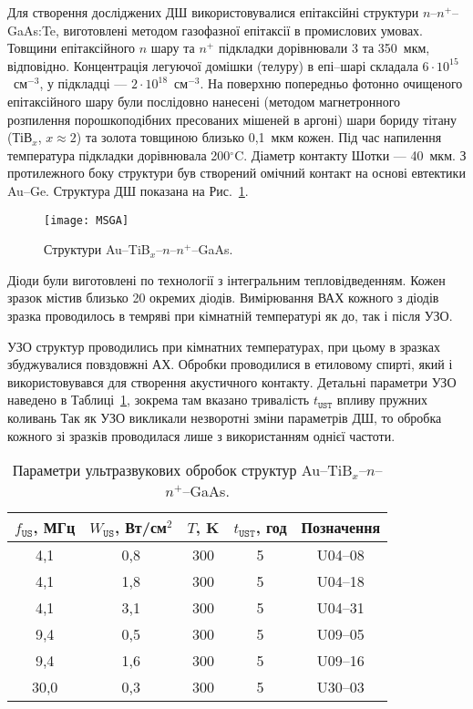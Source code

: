 \documentclass[a4paper,14pt,oneside,openany]{memoir}
\begin{document}
Для створення досліджених ДШ використовувалися епітаксійні структури $n$--$n^+$--GaAs:Te,
виготовлені методом газофазної епітаксії в промислових умовах.
Товщини епітаксійного $n$ шару та $n^+$ підкладки дорівнювали 3 та 350~мкм, відповідно.
Концентрація легуючої домішки (телуру) в епі--шарі складала $6\cdot10^{15}$~см$^{-3}$,
у підкладці --- $2\cdot10^{18}$~см$^{-3}$.
На поверхню попередньо фотонно очищеного епітаксійного шару були послідовно нанесені
(методом магнетронного розпилення порошкоподібних пресованих мішеней в аргоні)
шари бориду тітану (ТіВ$_x$, $x\approx2$) та золота товщиною близько 0,1~мкм кожен.
Під час напилення температура підкладки дорівнювала 200$^\circ$C.
Діаметр контакту Шотки --- 40~мкм.
З протилежного боку структури був створений омічний контакт на основі евтектики Au--Ge.
Структура ДШ показана на Рис.~\ref{figMSGA}.

\begin{figure}%
\center
\texttt{[image: MSGA]}%
\caption{\label{figMSGA}
Структури Au--TiB$_x$--$n$--$n^+$--GaAs.
}
\end{figure}

Діоди були виготовлені по технології з інтегральним тепловідведенням.
Кожен зразок містив близько 20 окремих діодів.
Вимірювання ВАХ кожного з діодів зразка проводилось в темряві при кімнатній температурі
як до, так і після УЗО.

УЗО структур проводились при кімнатних температурах, при цьому в зразках збуджувалися повздовжні АХ.
Обробки проводилися в етиловому спирті, який і використовувався для створення акустичного контакту.
Детальні параметри УЗО наведено в Таблиці~\ref{tabUST}, зокрема там вказано тривалість $t_\mathtt{UST}$ впливу пружних коливань
Так як УЗО викликали незворотні зміни параметрів ДШ, то обробка кожного зі зразків проводилася лише з використанням однієї частоти.

\begin{table}
\caption{\label{tabUST}Параметри ультразвукових обробок структур Au--TiB$_x$--$n$--$n^+$--GaAs.
}
\center
\begin{tabular}{|c|c|c|c|c|}
\hline
$f_\mathtt{US}$, МГц&$W_{\mathtt{US}}$, Вт/см$^2$&$T$, K&$t_\mathtt{UST}$, год &Позначення\\
\hline
4,1&0,8&300&5&U04--08\\ \hline
4,1&1,8&300&5&U04--18\\ \hline
4,1&3,1&300&5&U04--31\\ \hline
9,4&0,5&300&5&U09--05\\ \hline
9,4&1,6&300&5&U09--16\\ \hline
30,0&0,3&300&5&U30--03\\ \hline
\end{tabular}
\end{table}
\end{document}
